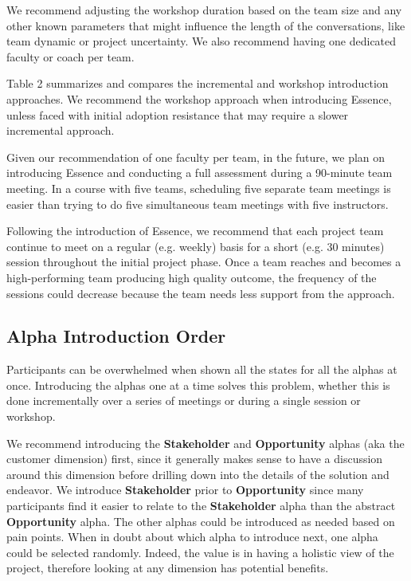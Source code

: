 We recommend adjusting the workshop duration based on the team size and any other known parameters that might influence the length of the conversations, like team dynamic or project uncertainty. We also recommend having one dedicated faculty or coach per team.

Table 2 summarizes and compares the incremental and workshop introduction approaches. We recommend the workshop approach when introducing Essence, unless faced with initial adoption resistance that may require a slower incremental approach.

Given our recommendation of one faculty per team, in the future, we plan on introducing Essence and conducting a full assessment during a 90-minute team meeting. In a course with five teams, scheduling five separate team meetings is easier than trying to do five simultaneous team meetings with five instructors.

Following the introduction of Essence, we recommend that each project team continue to meet on a regular (e.g. weekly) basis for a short (e.g. 30 minutes) session throughout the initial project phase. Once a team reaches  and becomes a high-performing team producing high quality outcome, the frequency of the sessions could decrease because the team needs less support from the approach.

\subsection{Alpha Introduction Order}
Participants can be overwhelmed when shown all the states for all the alphas at once. Introducing the alphas one at a time solves this problem, whether this is done incrementally over a series of meetings or during a single session or workshop.

We recommend introducing the \textbf{Stakeholder} and \textbf{Opportunity} alphas (aka the customer dimension) first, since it generally makes sense to have a discussion around this dimension before drilling down into the details of the solution and endeavor. We introduce \textbf{Stakeholder} prior to \textbf{Opportunity} since many participants find it easier to relate to the \textbf{Stakeholder} alpha than the abstract \textbf{Opportunity} alpha. The other alphas could be introduced as needed based on pain points. When in doubt about which alpha to introduce next, one alpha could be selected randomly. Indeed, the value is in having a holistic view of the project, therefore looking at any dimension has potential benefits.

